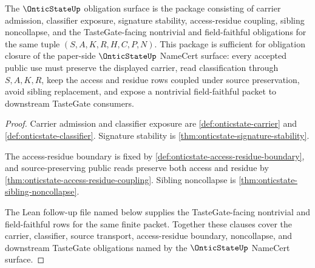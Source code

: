 \begin{theorem}
\label{thm:onticstate-obligation-closure-package}
The $\OnticStateUp$ obligation surface is the package consisting of carrier admission, classifier exposure, signature stability, access-residue coupling, sibling noncollapse, and the TasteGate-facing nontrivial and field-faithful obligations for the same tuple $(S,A,K,R,H,C,P,N)$. This package is sufficient for obligation closure of the paper-side $\OnticStateUp$ NameCert surface: every accepted public use must preserve the displayed carrier, read classification through $S,A,K,R$, keep the access and residue rows coupled under source preservation, avoid sibling replacement, and expose a nontrivial field-faithful packet to downstream TasteGate consumers.
\end{theorem}
\begin{proof}
Carrier admission and classifier exposure are \autoref{def:onticstate-carrier} and \autoref{def:onticstate-classifier}. Signature stability is \autoref{thm:onticstate-signature-stability}.

The access-residue boundary is fixed by \autoref{def:onticstate-access-residue-boundary}, and source-preserving public reads preserve both access and residue by \autoref{thm:onticstate-access-residue-coupling}. Sibling noncollapse is \autoref{thm:onticstate-sibling-noncollapse}.

The Lean follow-up file named below supplies the TasteGate-facing nontrivial and field-faithful rows for the same finite packet. Together these clauses cover the carrier, classifier, source transport, access-residue boundary, noncollapse, and downstream TasteGate obligations named by the $\OnticStateUp$ NameCert surface.
\end{proof}

